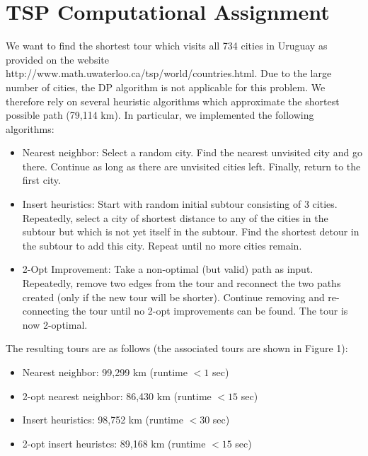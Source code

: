 \documentclass[11pt, oneside]{article}   	%
\begin{document}
\section{TSP Computational Assignment}
We want to find the shortest tour which visits all 734 cities in Uruguay as provided on the website http://www.math.uwaterloo.ca/tsp/world/countries.html. Due to the large number of cities, the DP algorithm is not applicable for this problem. We therefore rely on several heuristic algorithms which approximate the shortest possible path (79,114 km). In particular, we implemented the following algorithms:
\begin{itemize}
\item Nearest neighbor: Select a random city. Find the nearest unvisited city and go there. Continue as long as there are unvisited cities left. Finally, return to the first city.
\item Insert heuristics: Start with random initial subtour consisting of 3 cities. Repeatedly, select a city of shortest distance to any of the cities in the subtour but which is not yet itself in the subtour. Find the shortest detour in the subtour to add this city. Repeat until no more cities remain.
\item 2-Opt Improvement: Take a non-optimal (but valid) path as input. Repeatedly, remove two edges from the tour and reconnect the two paths created (only if the new tour will be shorter). Continue removing and re- connecting the tour until no 2-opt improvements can be found. The tour is now 2-optimal.
\end{itemize}

The resulting tours are as follows (the associated tours are shown in Figure 1):
\begin{itemize}
\item Nearest neighbor: 99,299 km (runtime $<1$ sec)
\item 2-opt nearest neighbor: 86,430 km (runtime $<15$ sec)
\item Insert heuristics: 98,752 km (runtime $<30$ sec)
\item 2-opt insert heuristcs: 89,168 km (runtime $<15$ sec)
\end{itemize}
\end{document}
